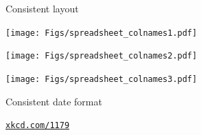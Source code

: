 \documentclass[aspectratio=169,12pt,t]{beamer}
\begin{document}
\begin{frame}{Consistent layout}


\texttt{[image: Figs/spreadsheet\_colnames1.pdf]}

\vspace*{-0.6\textheight}
\hspace*{0.1\textwidth}
\texttt{[image: Figs/spreadsheet\_colnames2.pdf]}

\vspace*{-0.6\textheight}
\hspace*{0.2\textwidth}
\texttt{[image: Figs/spreadsheet\_colnames3.pdf]}

  \note{

  }

\end{frame}




\begin{frame}[c]{Consistent date format}


  \note{

  }

\end{frame}



\begin{frame}[c]{}

\vspace{24pt}


\vfill

\hfill {\tt \footnotesize \lolit \href{http://xkcd.com/1179/}{xkcd.com/1179}}




\end{frame}





\begin{frame}[c]{}

  \centering

{
\setlength{\fboxsep}{0pt}
\setlength{\fboxrule}{1pt}

\begin{minipage}{0.7\textwidth}


\end{minipage}
}

  \note{

  }

\end{frame}
\end{document}
